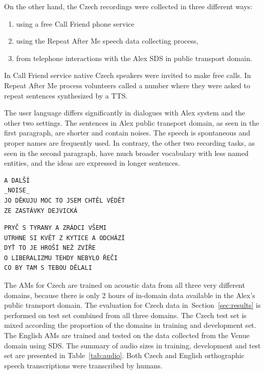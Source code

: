On the other hand, the Czech recordings were collected in three different ways\cite{korvas_2014}:
\begin{enumerate}
    \item using a free Call Friend phone service
    \item using the Repeat After Me speech data collecting process,
    \item from telephone interactions with the Alex \ac{SDS} in public transport domain.
\end{enumerate}

In Call Friend service native Czech speakers were invited to make free calls.
In Repeat After Me process volunteers called a number where they were asked to repeat 
sentences synthesized by a \ac{TTS}.

The user language differs significantly in dialogues with Alex system and the other two settings.
The sentences in Alex public transport domain, as seen in the first paragraph, are shorter and contain noises.
The speech is spontaneous and proper names are frequently used.
In contrary, the other two recording tasks, as seen in the second paragraph, have much broader vocabulary with less named entities, and the ideas are expressed in longer sentences.

\begin{verbatim}
A DALŠÍ
_NOISE_
JO DĚKUJU MOC TO JSEM CHTĚL VĚDĚT
ZE ZASTÁVKY DEJVICKÁ
\end{verbatim}

\begin{verbatim}
PRYČ S TYRANY A ZRÁDCI VŠEMI
UTRHNE SI KVĚT Z KYTICE A ODCHÁZÍ
DYŤ TO JE HROŠÍ NEŽ ZVÍŘE
O LIBERALIZMU TEHDY NEBYLO ŘEČI
CO BY TAM S TEBOU DĚLALI
\end{verbatim}


The \acp{AM} for Czech are trained on acoustic data from all three very different domains, because there is only 2 hours of in-domain data available in the Alex's public transport domain.
The evaluation for Czech data in~Section~\ref{sec:results} is performed  on test set combined from all three domains.
The Czech test set is mixed according the proportion of the domains in training and development set.
The English \acp{AM} are trained and tested on the data collected from the Venue domain using \ac{SDS}.
The summary of audio sizes in training, development and test set are presented in Table~\ref{tab:audio}.
Both Czech and English orthographic speech transcriptions were transcribed by humans.

